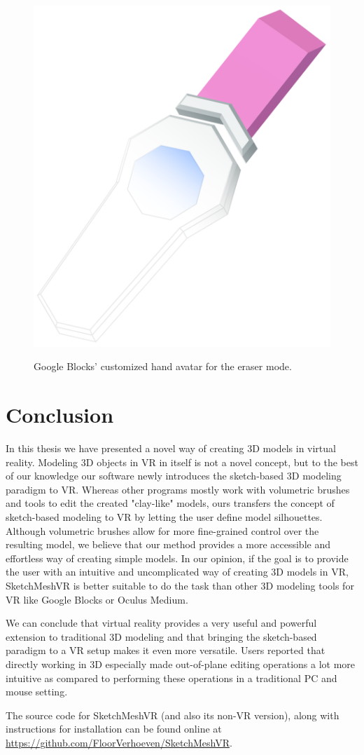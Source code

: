 \begin{figure}[!h]
    \centering
    \includegraphics[width=0.3\linewidth]{figures/blocks_tool}\\
    \caption[Google Blocks tool avatars]{Google Blocks' customized hand avatar for the eraser mode.
      \label{fig:blocks_tool}}
\end{figure}

\section{Conclusion}
In this thesis we have presented a novel way of creating 3D models in virtual reality. Modeling 3D objects in VR in itself is not a novel concept, but to the best of our knowledge our software newly introduces the sketch-based 3D modeling paradigm to VR. Whereas other programs mostly work with volumetric brushes and tools to edit the created "clay-like" models, ours transfers the concept of sketch-based modeling to VR by letting the user define model silhouettes. Although volumetric brushes allow for more fine-grained control over the resulting model, we believe that our method provides a more accessible and effortless way of creating simple models. In our opinion, if the goal is to provide the user with an intuitive and uncomplicated way of creating 3D models in VR, SketchMeshVR is better suitable to do the task than other 3D modeling tools for VR like Google Blocks or Oculus Medium. 

We can conclude that virtual reality provides a very useful and powerful extension to traditional 3D modeling and that bringing the sketch-based paradigm to a VR setup makes it even more versatile. Users reported that directly working in 3D especially made out-of-plane editing operations a lot more intuitive as compared to performing these operations in a traditional PC and mouse setting.

The source code for SketchMeshVR (and also its non-VR version), along with instructions for installation can be found online at \url{https://github.com/FloorVerhoeven/SketchMeshVR}. 